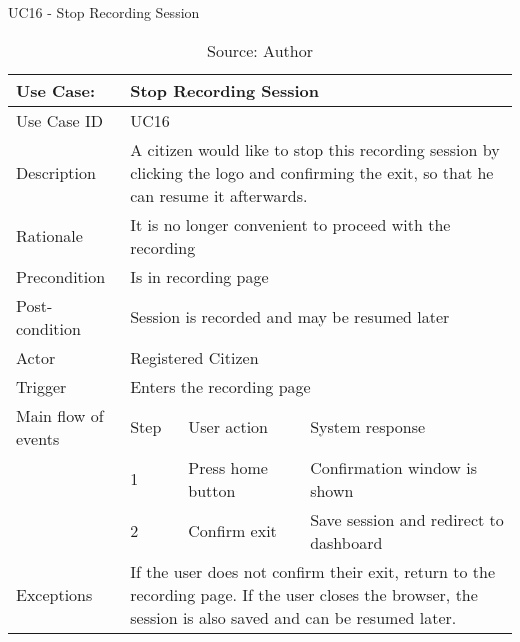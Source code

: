 \begin{table}[ht]
\centering
\caption{UC16 - Stop Recording Session}
\label{uc:16}
\begin{tabular}{|p{3cm}|p{1cm}|p{5cm}|p{5cm}|}
\hline
Use Case:       & \multicolumn{3}{p{11cm}|}{Stop Recording Session} \\ \hline
Use Case ID     & \multicolumn{3}{p{11cm}|}{UC16} \\ \hline
Description     & \multicolumn{3}{p{11cm}|}{A citizen would like to stop this recording session by clicking the logo and confirming the exit, so that he can resume it afterwards.} \\ \hline
Rationale       & \multicolumn{3}{p{11cm}|}{It is no longer convenient to proceed with the recording} \\ \hline
Precondition    & \multicolumn{3}{p{11cm}|}{Is in recording page} \\ \hline
Post-condition  & \multicolumn{3}{p{11cm}|}{Session is recorded and may be resumed later} \\ \hline
Actor           & \multicolumn{3}{p{11cm}|}{Registered Citizen} \\ \hline
Trigger         & \multicolumn{3}{p{11cm}|}{Enters the recording page} \\ \hline
Main flow of events & Step  & User action & System response \\ \hline
                    & 1     & Press home button & Confirmation window is shown \\ \hline
                    & 2     & Confirm exit & Save session and redirect to dashboard \\ \hline
Exceptions      & \multicolumn{3}{p{11cm}|}{If the user does not confirm their exit, return to the recording page. If the user closes the browser, the session is also saved and can be resumed later.} \\ \hline
\end{tabular}
\caption*{Source: Author}
\end{table}


